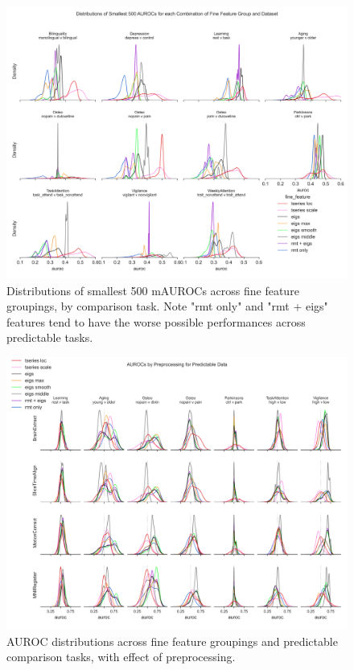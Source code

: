\documentclass{article}  %
\begin{document}
\begin{figure}[H]
\begin{center}
\includegraphics[width=\textwidth,height=0.9\textheight,keepaspectratio]{fine_feature_smallest_by_subgroup.png}
\end{center}
\caption
{ \label{fig:fine-smallest} Distributions of smallest 500 mAUROCs across fine
feature groupings, by comparison task. Note "rmt only" and "rmt + eigs"
features tend to have the worse possible performances across predictable
tasks.}
\end{figure}



\begin{figure}[H]
\begin{center}
\includegraphics[width=\textwidth,height=0.9\textheight,keepaspectratio]{fine_feature_by_preproc_predictive_subgroup.png}
\end{center}
\caption
{ \label{fig:fine-preproc}
AUROC distributions across fine feature groupings and predictable comparison tasks, with effect of preprocessing.}
\end{figure}
\end{document}
